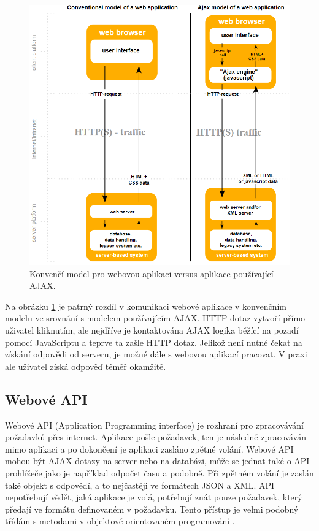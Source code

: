 \FloatBarrier
\begin{figure}[!htb]
\label{AJAX}
\centering
\includegraphics[width=\textwidth/2]{obrazky-figures/AJAX.png}
\caption{Konvenčí model pro webovou aplikaci versus aplikace používající AJAX.}
\end{figure}
\FloatBarrier

Na obrázku \ref{AJAX} je patrný rozdíl v komunikaci webové aplikace v konvenčním modelu ve srovnání s modelem používajícím AJAX. HTTP dotaz vytvoří přímo uživatel kliknutím, ale nejdříve je kontaktována AJAX logika běžící na pozadí pomocí JavaScriptu a teprve ta zašle HTTP dotaz. Jelikož není nutné čekat na získání odpovědi od serveru, je možné dále s webovou aplikací pracovat. V praxi ale uživatel získá odpověď téměř okamžitě.

        \subsection{Webové API}
Webové API (Application Programming interface) je rozhraní pro zpracovávání požadavků přes internet. Aplikace pošle požadavek, ten je následně zpracováván mimo aplikaci a po dokončení je aplikaci zasláno zpětné volání. Webové API mohou být AJAX dotazy na server nebo na databázi, může se jednat také o API prohlížeče jako je například odpočet času a podobně. Při zpětném volání je zaslán také objekt s odpovědí, a to nejčastěji ve formátech JSON a XML. API nepotřebují vědět, jaká aplikace je volá, potřebují znát pouze požadavek, který předají ve formátu definovaném v požadavku. Tento přístup je velmi podobný třídám s metodami v objektově orientovaném programování \cite{webapis}.
